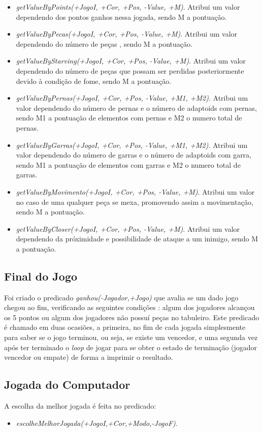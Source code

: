 \documentclass[a4paper]{article}
\begin{document}
\begin{itemize}
    \item \textit{getValueByPoints(+JogoI, +Cor, +Pos, -Value, +M)}. Atribui um valor dependendo dos pontos ganhos nessa jogada, sendo M a pontuação.
    \item \textit{getValueByPecas(+JogoI, +Cor, +Pos, -Value, +M)}. Atribui um valor dependendo do número de peças , sendo M a pontuação.
    \item \textit{getValueByStarving(+JogoI, +Cor, +Pos, -Value, +M)}. Atribui um valor dependendo do número de peças que possam ser perdidas posteriormente devido à condição de fome, sendo M a pontuação.
    \item \textit{getValueByPernas(+JogoI, +Cor, +Pos, -Value, +M1, +M2)}. Atribui um valor dependendo do número de pernas e o número de adaptoids com pernas, sendo M1 a pontuação de elementos com pernas e M2 o numero total de pernas.
    \item \textit{getValueByGarras(+JogoI, +Cor, +Pos, -Value, +M1, +M2)}. Atribui um valor dependendo do número de garras e o número de adaptoids com garra, sendo M1 a pontuação de elementos com garras e M2 o numero total de garras.
    \item \textit{getValueByMovimento(+JogoI, +Cor, +Pos, -Value, +M)}. Atribui um valor no caso de uma qualquer peça se mexa, promovendo assim a movimentação, sendo M a pontuação.
    \item \textit{getValueByCloser(+JogoI, +Cor, +Pos, -Value, +M)}. Atribui um valor dependendo da próximidade e possibilidade de ataque a um inimigo, sendo M a pontuação.
\end{itemize}

\subsection{Final do Jogo} Foi criado o predicado \textit{ganhou(-Jogador,+Jogo)} que avalia se um dado jogo chegou ao fim, verificando as seguintes condições : algum dos jogadores alcançou os 5 pontos ou algum dos jogadores não possuí peças no tabuleiro. Este predicado é chamado em duas ocasiões, a primeira, no fim de cada jogada simplesmente para saber se o jogo terminou, ou seja, se existe um vencedor, e uma segunda vez após ter terminado o \textit{loop} de jogar para se obter o estado de terminação (jogador vencedor ou empate) de forma a imprimir o resultado.

\subsection{Jogada do Computador}
A escolha da melhor jogada é feita no predicado:
\begin{itemize}
	\item \textit{escolheMelhorJogada(+JogoI,+Cor,+Modo,-JogoF)}.
\end{itemize}
\end{document}
